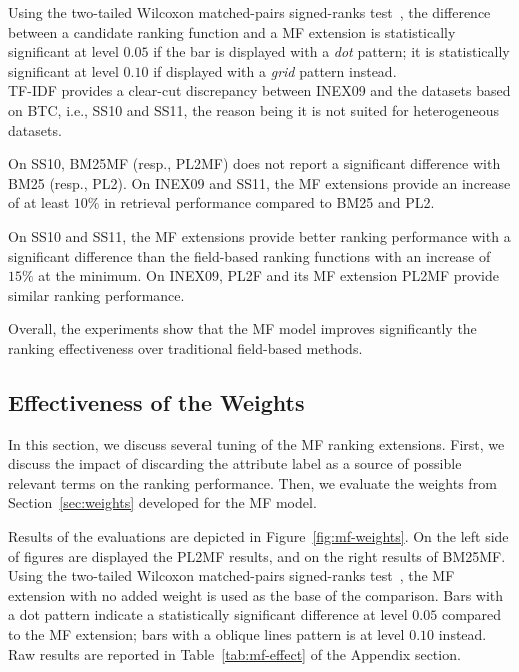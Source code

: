 Using the two-tailed Wilcoxon matched-pairs signed-ranks test~\cite{sheskin:2003:CRC,buttcher:2010:IRI:1869919}, the difference between a candidate ranking function and a MF extension is statistically significant at level $0.05$ if the bar is displayed with a \textit{dot} pattern; it is statistically significant at level $0.10$ if displayed with a \emph{grid} pattern instead.\\

TF-IDF provides a clear-cut discrepancy between INEX09 and the datasets based on BTC, i.e., SS10 and SS11, the reason being it is not suited for heterogeneous datasets.

On SS10, BM25MF (resp., PL2MF) does not report a significant difference with BM25 (resp., PL2). On INEX09 and SS11, the MF extensions provide an increase of at least $10\%$ in retrieval performance compared to BM25 and PL2.

On SS10 and SS11, the MF extensions provide better ranking performance with a significant difference than the field-based ranking functions with an increase of $15\%$ at the minimum. On INEX09, PL2F and its MF extension PL2MF provide similar ranking performance.

Overall, the experiments show that the MF model improves significantly the ranking effectiveness over traditional field-based methods.



\subsection{Effectiveness of the Weights}
\label{sec:weights-effectiveness}

In this section, we discuss several tuning of the MF ranking extensions. First, we discuss the impact of discarding the attribute label as a source of possible relevant terms on the ranking performance. Then, we evaluate the weights from Section~\ref{sec:weights} developed for the MF model.

Results of the evaluations are depicted in Figure~\ref{fig:mf-weights}. On the left side of figures are displayed the PL2MF results, and on the right results of BM25MF. Using the two-tailed Wilcoxon matched-pairs signed-ranks test~\cite{sheskin:2003:CRC,buttcher:2010:IRI:1869919}, the MF extension with no added weight is used as the base of the comparison. Bars with a dot pattern indicate a statistically significant difference at level $0.05$ compared to the MF extension; bars with a oblique lines pattern is at level $0.10$ instead. Raw results are reported in Table~\ref{tab:mf-effect} of the Appendix section.

